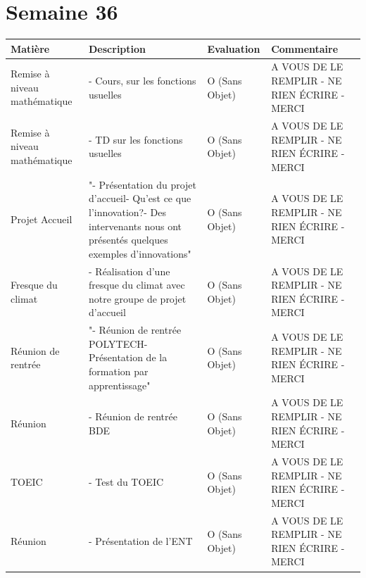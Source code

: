 \documentclass[12pt, openany]{report}
\begin{document}
\section*{Semaine 36}
\begin{tabular}{|l|l|l|l|}
\hline
Matière & Description & Evaluation & Commentaire \\ 
\hline
Remise à niveau mathématique & - Cours, sur les fonctions usuelles & O (Sans Objet) & A VOUS DE LE REMPLIR - NE RIEN ÉCRIRE - MERCI \\ 
\hline
Remise à niveau mathématique & - TD sur les fonctions usuelles & O (Sans Objet) & A VOUS DE LE REMPLIR - NE RIEN ÉCRIRE - MERCI \\ 
\hline
Projet Accueil & "- Présentation du projet d'accueil- Qu'est ce que l'innovation?- Des intervenants nous ont présentés quelques exemples d'innovations" & O (Sans Objet) & A VOUS DE LE REMPLIR - NE RIEN ÉCRIRE - MERCI \\ 
\hline
Fresque du climat & - Réalisation d'une fresque du climat avec notre groupe de projet d'accueil & O (Sans Objet) & A VOUS DE LE REMPLIR - NE RIEN ÉCRIRE - MERCI \\ 
\hline
Réunion de rentrée  & "- Réunion de rentrée POLYTECH- Présentation de la formation par apprentissage" & O (Sans Objet) & A VOUS DE LE REMPLIR - NE RIEN ÉCRIRE - MERCI \\ 
\hline
Réunion & - Réunion de rentrée BDE & O (Sans Objet) & A VOUS DE LE REMPLIR - NE RIEN ÉCRIRE - MERCI \\ 
\hline
TOEIC & - Test du TOEIC & O (Sans Objet) & A VOUS DE LE REMPLIR - NE RIEN ÉCRIRE - MERCI \\ 
\hline
Réunion & - Présentation de l'ENT & O (Sans Objet) & A VOUS DE LE REMPLIR - NE RIEN ÉCRIRE - MERCI \\ 
\hline
\end{tabular}
\end{document}
